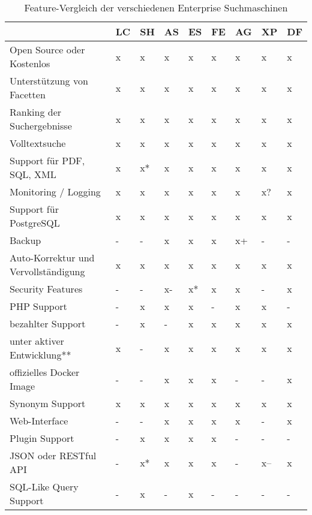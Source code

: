 \begin{table} %
	\centering
		\begin{tabular}{l | l | l | l | l | l | l | l | l}
		& \textbf{LC} & \textbf{SH} & \textbf{AS} & \textbf{ES}  & \textbf{FE} & \textbf{AG} & \textbf{XP} & \textbf{DF} \\
        \hline
        Open Source oder Kostenlos                  & x & x  & x & x  & x & x  & x & x \\
        Unterstützung von Facetten                  & x & x  & x & x  & x & x  & x & x \\
        Ranking der Suchergebnisse                  & x & x  & x & x  & x & x  & x & x \\
        Volltextsuche                               & x & x  & x & x  & x & x  & x & x \\
        Support für PDF, SQL, XML                   & x & x* & x & x  & x & x  & x & x \\
        Monitoring / Logging                        & x & x  & x & x  & x & x  & x? & x \\
        \hline
        Support für PostgreSQL                      & x & x  & x  & x  & x & x  & x & x \\
        Backup                                      & - & -  & x  & x  & x & x+ & - & - \\
        Auto-Korrektur und Vervollständigung        & x & x  & x  & x  & x & x  & x & x \\
        Security Features                           & - & -  & x- & x* & x & x  & - & x \\
        PHP Support                                 & - & x  & x  & x  & - & x  & x & - \\
        bezahlter Support                           & - & x  & -  & x  & x & x  & x & x \\
        \hline
        unter aktiver Entwicklung**                 & x & -  & x  & x  & x & x  & x & x \\
        offizielles Docker Image                    & - & -  & x  & x  & x & -  & - & x \\
        Synonym Support                             & x & x  & x  & x  & x & x  & x & x \\
        Web-Interface                               & - & -  & x  & x  & x & x  & - & x \\
        Plugin Support                              & - & x  & x  & x  & x & -  & - & - \\
        JSON oder RESTful API                       & - & x* & x  & x  & x & -  & x-- & x \\
        SQL-Like Query Support                      & - & x  & -  & x  & - & -  & - & - \\
		\end{tabular}
    \caption{Feature-Vergleich der verschiedenen Enterprise Suchmaschinen }
    \label{vglTable}


\end{table}
